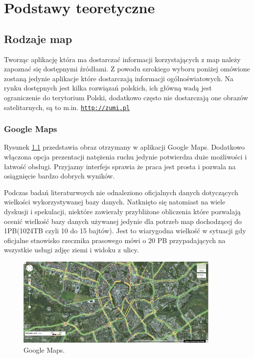 

\chapter{Podstawy teoretyczne}
\label{cha:podstawyTeoretyczne}

\section{Rodzaje map}
\label{sec:Rodzaje map}

Tworząc aplikację która ma dostarczać informacji korzystających z map należy zapoznać się dostępnymi źródłami. Z powodu szrokiego wyboru poniżej omówione zostaną jedynie aplikacje które dostarczają informacji ogólnoświatowych. Na rynku dostępnych jest kilka rozwiązań polskich, ich główną wadą jest ograniczenie do terytorium Polski, dodatkowo często nie dostarczają one obrazów satelitarnych, są to m.in. \underline{\texttt{http://zumi.pl}}


\subsection{Google Maps}
\label{subsec:Google Maps}
\nocite{googlemapsbegin}
Rysunek \ref{fig:googleMaps_1} przedstawia obraz otrzymany w aplikacji Google Maps. Dodatkowo włączona opcja prezentacji natężenia ruchu jedynie potwierdza duże możliwości i łatwość obsługi. Przyjazny interfejs sprawia że praca jest prosta i pozwala na osiągnięcie bardzo dobrych wyników.

Podczas badań literaturwoych nie odnaleziono oficjalnych danych dotyczących wielkości wykorzystywanej bazy danych.
Natknięto się natomiast na wiele dyskusji i spekulacji, niektóre zawierały przybliżone obliczenia które pozwalają ocenić wielkość bazy danych używanej jedynie dla potrzeb map dochodzącej do 1PB(1024TB czyli 10 do 15 bajtów).
Jest to wiarygodna wielkość w sytuacji gdy oficjalne stnowisko rzecznika prasowego mówi o 20 PB przypadających na wszystkie usługi zdjęc ziemi i widoku z ulicy.\cite{googledatabase}


\begin{figure}[H]
  \centering
    \includegraphics[width=100mm]{ge/gm_1.jpg}
  \caption{Google Maps.}
  \label{fig:googleMaps_1}
\end{figure}


